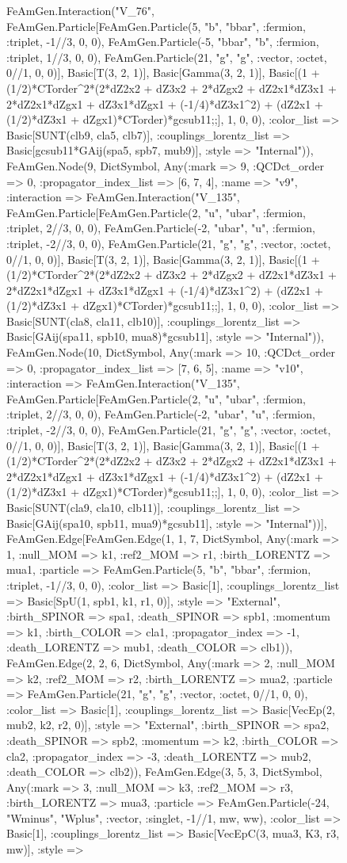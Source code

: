 \documentclass{revtex4}
\begin{document}
\begin{figure}[!htb]
\begin{center}
{FeAmGen.Interaction("V_76", FeAmGen.Particle[FeAmGen.Particle(5, "b", "bbar", :fermion, :triplet, -1//3, 0, 0), FeAmGen.Particle(-5, "bbar", "b", :fermion, :triplet, 1//3, 0, 0), FeAmGen.Particle(21, "g", "g", :vector, :octet, 0//1, 0, 0)], Basic[T(3, 2, 1)], Basic[Gamma(3, 2, 1)], Basic[(1 + (1/2)*CTorder^2*(2*dZ2x2 + dZ3x2 + 2*dZgx2 + dZ2x1*dZ3x1 + 2*dZ2x1*dZgx1 + dZ3x1*dZgx1 + (-1/4)*dZ3x1^2) + (dZ2x1 + (1/2)*dZ3x1 + dZgx1)*CTorder)*gcsub11;;], 1, 0, 0), :color_list => Basic[SUNT(clb9, cla5, clb7)], :couplings_lorentz_list => Basic[gcsub11*GAij(spa5, spb7, mub9)], :style => "Internal")), FeAmGen.Node(9, Dict{Symbol, Any}(:mark => 9, :QCDct_order => 0, :propagator_index_list => [6, 7, 4], :name => "v9", :interaction => FeAmGen.Interaction("V_135", FeAmGen.Particle[FeAmGen.Particle(2, "u", "ubar", :fermion, :triplet, 2//3, 0, 0), FeAmGen.Particle(-2, "ubar", "u", :fermion, :triplet, -2//3, 0, 0), FeAmGen.Particle(21, "g", "g", :vector, :octet, 0//1, 0, 0)], Basic[T(3, 2, 1)], Basic[Gamma(3, 2, 1)], Basic[(1 + (1/2)*CTorder^2*(2*dZ2x2 + dZ3x2 + 2*dZgx2 + dZ2x1*dZ3x1 + 2*dZ2x1*dZgx1 + dZ3x1*dZgx1 + (-1/4)*dZ3x1^2) + (dZ2x1 + (1/2)*dZ3x1 + dZgx1)*CTorder)*gcsub11;;], 1, 0, 0), :color_list => Basic[SUNT(cla8, cla11, clb10)], :couplings_lorentz_list => Basic[GAij(spa11, spb10, mua8)*gcsub11], :style => "Internal")), FeAmGen.Node(10, Dict{Symbol, Any}(:mark => 10, :QCDct_order => 0, :propagator_index_list => [7, 6, 5], :name => "v10", :interaction => FeAmGen.Interaction("V_135", FeAmGen.Particle[FeAmGen.Particle(2, "u", "ubar", :fermion, :triplet, 2//3, 0, 0), FeAmGen.Particle(-2, "ubar", "u", :fermion, :triplet, -2//3, 0, 0), FeAmGen.Particle(21, "g", "g", :vector, :octet, 0//1, 0, 0)], Basic[T(3, 2, 1)], Basic[Gamma(3, 2, 1)], Basic[(1 + (1/2)*CTorder^2*(2*dZ2x2 + dZ3x2 + 2*dZgx2 + dZ2x1*dZ3x1 + 2*dZ2x1*dZgx1 + dZ3x1*dZgx1 + (-1/4)*dZ3x1^2) + (dZ2x1 + (1/2)*dZ3x1 + dZgx1)*CTorder)*gcsub11;;], 1, 0, 0), :color_list => Basic[SUNT(cla9, cla10, clb11)], :couplings_lorentz_list => Basic[GAij(spa10, spb11, mua9)*gcsub11], :style => "Internal"))], FeAmGen.Edge[FeAmGen.Edge(1, 1, 7, Dict{Symbol, Any}(:mark => 1, :null_MOM => k1, :ref2_MOM => r1, :birth_LORENTZ => mua1, :particle => FeAmGen.Particle(5, "b", "bbar", :fermion, :triplet, -1//3, 0, 0), :color_list => Basic[1], :couplings_lorentz_list => Basic[SpU(1, spb1, k1, r1, 0)], :style => "External", :birth_SPINOR => spa1, :death_SPINOR => spb1, :momentum => k1, :birth_COLOR => cla1, :propagator_index => -1, :death_LORENTZ => mub1, :death_COLOR => clb1)), FeAmGen.Edge(2, 2, 6, Dict{Symbol, Any}(:mark => 2, :null_MOM => k2, :ref2_MOM => r2, :birth_LORENTZ => mua2, :particle => FeAmGen.Particle(21, "g", "g", :vector, :octet, 0//1, 0, 0), :color_list => Basic[1], :couplings_lorentz_list => Basic[VecEp(2, mub2, k2, r2, 0)], :style => "External", :birth_SPINOR => spa2, :death_SPINOR => spb2, :momentum => k2, :birth_COLOR => cla2, :propagator_index => -3, :death_LORENTZ => mub2, :death_COLOR => clb2)), FeAmGen.Edge(3, 5, 3, Dict{Symbol, Any}(:mark => 3, :null_MOM => k3, :ref2_MOM => r3, :birth_LORENTZ => mua3, :particle => FeAmGen.Particle(-24, "Wminus", "Wplus", :vector, :singlet, -1//1, mw, ww), :color_list => Basic[1], :couplings_lorentz_list => Basic[VecEpC(3, mua3, K3, r3, mw)], :style => }
\end{center}
\end{figure}
\end{document}
